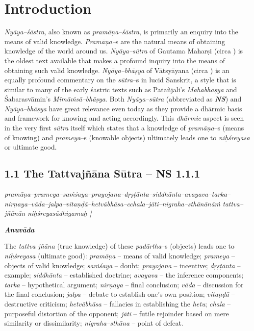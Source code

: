 
\chapter{Introduction}\label{chapter8}

\textit{Nyāya–śāstra}, also known as \textit{pramāṇa–śāstra}, is primarily an enquiry into the means of valid knowledge. \textit{Pramāṇa–}s are the natural means of obtaining knowledge of the world around us. \textit{Nyāya–sūtra} of Gautama Maharṣi (circa ) is the oldest text available that makes a profound inquiry into the means of obtaining such valid knowledge. \textit{Nyāya–bhāṣya} of Vātsyāyana (circa ) is an equally profound commentary on the \textit{sūtra}–s in lucid Sanskrit, a style that is similar to many of the early śāstric texts such as Patañjali’s \textit{Mahābhāṣya} and Śabarasvāmin’s \textit{Mīmāṁsā–bhāṣya}. Both \textit{Nyāya–sūtra }(abbreviated as \textit{\textbf{NS}}) and \textit{Nyāya–bhāṣya} have great relevance even today as they provide a dhārmic basis and framework for knowing and acting accordingly. This \textit{dhārmic} aspect is seen in the very first \textit{sūtra} itself which states that a knowledge of \textit{pramāṇa}–s (means of knowing) and \textit{prameya}–s (knowable objects) ultimately leads one to \textit{niḥśreyasa} or ultimate good.

\section*{1.1 The Tattvajñāna Sūtra – NS 1.1.1}

\begin{myquote}
\textit{pramāṇa–prameya–saṁśaya–prayojana–dṛṣṭānta–siddhānta–avayava–tarka–nirṇaya–vāda–jalpa–vitaṇḍā–hetvābhāsa–cchala–jāti–nigraha–sthānānāṁ tattva–jñānān niḥśreyasādhigamaḥ |}
\end{myquote}

\textit{\textbf{Anuvāda}}

The \textit{tattva jñāna} (true knowledge) of these \textit{padārtha}–s (objects) leads one to \textit{niḥśreyasa} (ultimate good): \textit{pramāṇa} – means of valid knowledge; \textit{prameya} – objects of valid knowledge; \textit{saṁśaya} – doubt; \textit{prayojana} – incentive; \textit{dṛṣṭānta} – example; \textit{siddhānta} – established doctrine; \textit{avayava} – the inference components; \textit{tarka} – hypothetical argument; \textit{nirṇaya} – final conclusion; \textit{vāda} – discussion for the final conclusion; \textit{jalpa} – debate to establish one’s own position; \textit{vitaṇḍā} – destructive criticism; \textit{hetvābhāsa} – fallacies in establishing the \textit{hetu}; \textit{chala} – purposeful distortion of the opponent; \textit{jāti} – futile rejoinder based on mere similarity or dissimilarity; \textit{nigraha–sthāna} – point of defeat.

